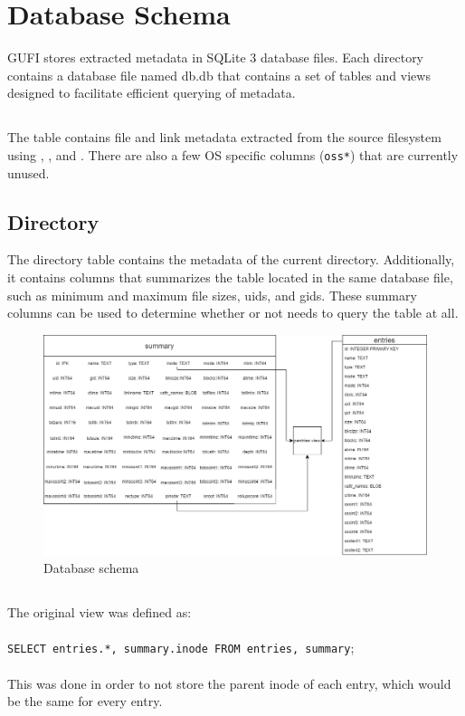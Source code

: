 \section{Database Schema}
\label{sec:schema}
GUFI stores extracted metadata in SQLite 3 database files. Each
directory contains a database file named db.db that contains a set of
tables and views designed to facilitate efficient querying of
metadata.

\subsection{\entries}
The \entries table contains file and link metadata extracted from the
source filesystem using \stat, \readlink, and \listxattr. There are
also a few OS specific columns (\texttt{oss*}) that are currently
unused.

\subsection{Directory \summary}
The directory \summary table contains the metadata of the current
directory. Additionally, it contains columns that summarizes the
\entries table located in the same database file, such as minimum and
maximum file sizes, uids, and gids. These summary columns can be used
to determine whether or not \querydb needs to query the \entries table
at all.

\begin{figure} [h]
\centering
\includegraphics[width=1.0\textwidth]{images/Database_Schemas.png}
\caption{\label{fig:Database Schema}Database schema}
\end{figure}

\subsection{\pentries}
The original \pentries view was defined as:
\\\\
\texttt{SELECT entries.*, summary.inode FROM entries, summary};
\\\\
This was done in order to not store the parent inode of each entry,
which would be the same for every entry.


